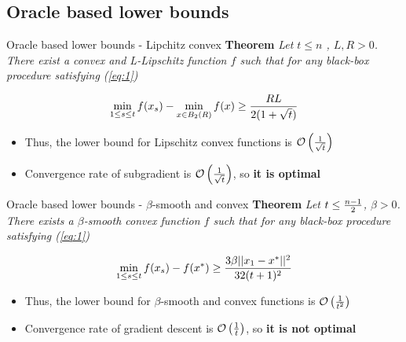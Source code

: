 \subsection{Oracle based lower bounds}
\begin{frame}{Oracle based lower bounds - Lipchitz convex}
    \textbf{Theorem} {\it Let $t \leq n$ , $L,R > 0$. There exist a convex and L-Lipschitz function $f$ such that for any black-box procedure satisfying (\ref{eq:1})}

    $$\min\limits_{1 \leq s \leq t}f(x_s) - \min\limits_{x \in B_2(R)}f(x) \geq {RL \over 2(1+\sqrt{t})}$$

    \begin{itemize}
        \item Thus, the lower bound for Lipschitz convex functions is $\mathcal{O}\left({1 \over {\sqrt{t}}}\right)$  
        \item  Convergence rate of subgradient is $\mathcal{O}\left({1 \over {\sqrt{t}}}\right)$, so \textbf{it is optimal}
    \end{itemize}
\end{frame}

\begin{frame}{Oracle based lower bounds - $\beta$-smooth and convex}
    \textbf{Theorem} {\it Let $t \leq { n-1 \over 2}$, $\beta > 0$. There exists a $\beta$-smooth convex function $f$ such that for any black-box procedure satisfying (\ref{eq:1})}

    $$\min\limits_{1 \leq s \leq t}f(x_s) - f(x^*) \geq {3\beta||x_1-x^*||^2 \over 32(t+1)^2}$$

    \begin{itemize}
        \item Thus, the lower bound for $\beta$-smooth and convex functions is $\mathcal{O}\left({1 \over {t}^2}\right)$ 
        \item  Convergence rate of gradient descent is $\mathcal{O}\left({1 \over t}\right)$, so \textbf{it is not optimal}
    \end{itemize}
\end{frame}

